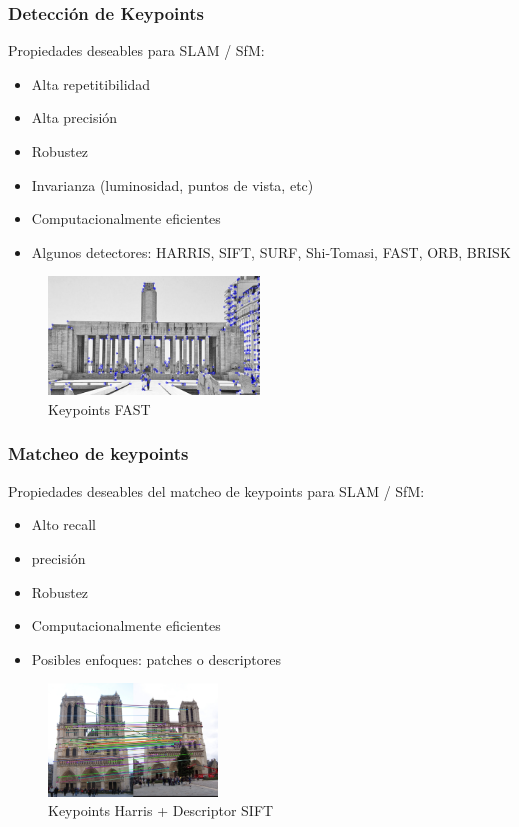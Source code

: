 \begin{frame}
	\frametitle{Detección de Keypoints}
	
	
	\footnotesize
	Propiedades deseables para SLAM / SfM:
	\begin{itemize}
		\item Alta repetitibilidad
		\item Alta precisión
		\item Robustez
		\item Invarianza (luminosidad, puntos de vista, etc)
		\item Computacionalmente eficientes
		\item Algunos detectores: HARRIS, SIFT, SURF, Shi-Tomasi, FAST, ORB, BRISK
	\end{itemize}

	
	\begin{figure}
		\includegraphics[width=0.5\textwidth]{./images/keypoints_fast}
		\caption{Keypoints FAST}
	\end{figure}

\end{frame}


\begin{frame}
	\frametitle{Matcheo de keypoints}
	\footnotesize
	Propiedades deseables del matcheo de keypoints para SLAM / SfM:
	\begin{itemize}
		\item Alto recall
		\item precisión
		\item Robustez
		\item Computacionalmente eficientes
		\item Posibles enfoques: patches o descriptores
	\end{itemize}
	
	\begin{figure}
		\includegraphics[width=0.4\textwidth]{./images/matching_notredam.jpg}
		\caption{Keypoints Harris + Descriptor SIFT}
	\end{figure}
\end{frame}

